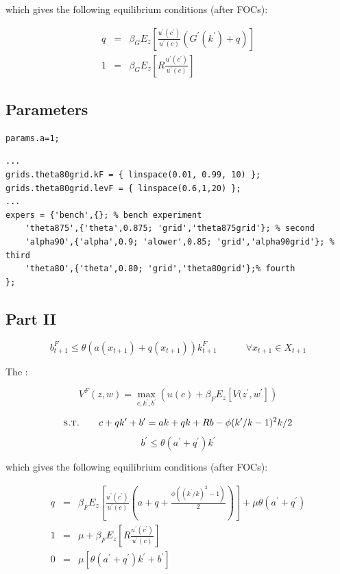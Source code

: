 \documentclass{article}
\begin{document}
which gives the following equilibrium conditions (after FOCs):

\begin{eqnarray*}
 q & = & \beta_G E_z\left[ \frac{u^\prime(c^\prime)}{u^\prime(c)}\left(G^\prime(k^\prime)+q\right)\right]\\
 1 & = & \beta_G E_z\left[R\frac{u^\prime(c^\prime)}{u^\prime(c)}\right]
\end{eqnarray*}


\subsection*{Parameters}


\begin{verbatim}
params.a=1;

\end{verbatim}



\color{lightgray} \begin{verbatim} 
...
grids.theta80grid.kF = { linspace(0.01, 0.99, 10) };
grids.theta80grid.levF = { linspace(0.6,1,20) };
...
expers = {'bench',{}; % bench experiment
    'theta875',{'theta',0.875; 'grid','theta875grid'}; % second
    'alpha90',{'alpha',0.9; 'alower',0.85; 'grid','alpha90grid'}; % third
    'theta80',{'theta',0.80; 'grid','theta80grid'};% fourth
};

\end{verbatim} \color{black}




\subsection*{Part II}

$$b_{t+1}^F \leq \theta \left( a(x_{t+1}) + q(x_{t+1}) \right)k_{t+1}^F  \quad \quad \quad \forall x_{t+1} \in X_{t+1} $$


The :

$$ V^F(z,w) = \max_{c,k^{\prime},b^{\prime} } \left( u(c) + \beta_F E_z \left[ V(z^{\prime},w^{\prime} \right]  \right) $$

$$ \textsc{s.t.} \quad \quad c+qk^\prime+b^\prime = ak + qk +Rb - \phi(k^\prime/k - 1)^2k/2$$
$$b^\prime \leq \theta \left( a^\prime + q^\prime \right)k^\prime $$

which gives the following equilibrium conditions (after FOCs):

\begin{eqnarray*}
 q & = & \beta_F E_z\left[ \frac{u^\prime(c^\prime)}{u^\prime(c)}(a+q+\frac{\phi((k^\prime/k)^2 -1)}{2})\right]+\mu \theta (a^\prime + q^\prime)\\
 1 & = & \mu + \beta_F E_z\left[R\frac{u^\prime(c^\prime)}{u^\prime(c)}\right] \\
 0 & = & \mu \left[\theta (a^\prime + q^\prime) k^\prime + b^\prime\right] 
\end{eqnarray*}
\end{document}
